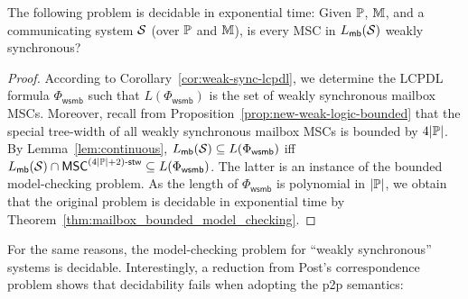\documentclass{article}
\begin{document}
\begin{theorem}\label{thm:mailbox-weak-sync}
The following problem is decidable in exponential time:
Given $\mathbb{P}$, $\mathbb{M}$, and a communicating system $\mathcal{S}$ (over $\mathbb{P}$ and $\mathbb{M}$), is every MSC in $L_{\mathsf{mb}}(\mathcal{S})$ weakly synchronous?
\end{theorem}

\begin{proof}
According to Corollary~\ref{cor:weak-sync-lcpdl},
we determine the LCPDL formula $\Phi_\mathsf{wsmb}$ such
that $L(\Phi_\mathsf{wsmb})$ is the set of weakly synchronous mailbox MSCs. Moreover,
recall from Proposition~\ref{prop:new-weak-logic-bounded} that
the special tree-width of all weakly synchronous mailbox MSCs is bounded by
$4|\mathbb{P}|$.
%
By Lemma~\ref{lem:continuous},
$L_{\mathsf{mb}}(\mathcal{S}) \subseteq L(\Phi_\mathsf{wsmb})$ iff
$L_{\mathsf{mb}}(\mathcal{S}) \cap \mathsf{MSC}^{(4|\mathbb{P}|+2)\textup{-}\mathsf{stw}} \subseteq L(\Phi_\mathsf{wsmb})$.
The latter is an instance of the bounded model-checking problem.
As the length of $\Phi_\mathsf{wsmb}$ is polynomial in
$|\mathbb{P}|$, we obtain that the original problem is decidable
in exponential time by Theorem~\ref{thm:mailbox_bounded_model_checking}.
\end{proof}

For the same reasons, the model-checking problem for ``weakly
synchronous'' systems is decidable.
%
Interestingly, a reduction from Post's correspondence problem
shows that decidability fails when adopting the p2p semantics:
\end{document}
